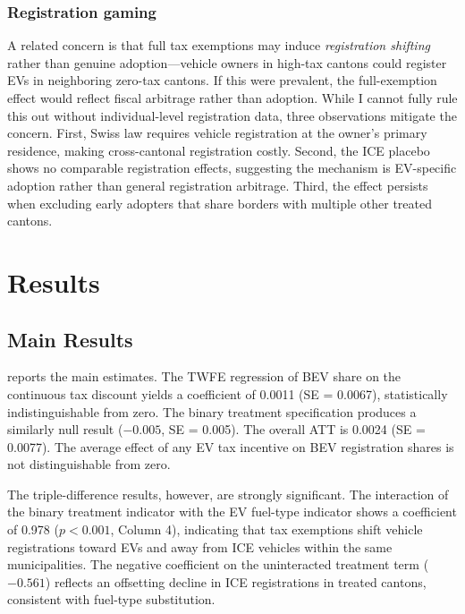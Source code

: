 \documentclass[12pt]{article}
\begin{document}
\subsubsection*{Registration gaming} A related concern is that full tax exemptions may induce \textit{registration shifting} rather than genuine adoption---vehicle owners in high-tax cantons could register EVs in neighboring zero-tax cantons. If this were prevalent, the full-exemption effect would reflect fiscal arbitrage rather than adoption. While I cannot fully rule this out without individual-level registration data, three observations mitigate the concern. First, Swiss law requires vehicle registration at the owner's primary residence, making cross-cantonal registration costly. Second, the ICE placebo shows no comparable registration effects, suggesting the mechanism is EV-specific adoption rather than general registration arbitrage. Third, the effect persists when excluding early adopters that share borders with multiple other treated cantons.

\section{Results}

\subsection{Main Results}

 reports the main estimates. The TWFE regression of BEV share on the continuous tax discount yields a coefficient of 0.0011 (SE = 0.0067), statistically indistinguishable from zero. The binary treatment specification produces a similarly null result ($-0.005$, SE = 0.005). The \citet{callaway2021difference} overall ATT is 0.0024 (SE = 0.0077). The average effect of any EV tax incentive on BEV registration shares is not distinguishable from zero.

The triple-difference results, however, are strongly significant. The interaction of the binary treatment indicator with the EV fuel-type indicator shows a coefficient of 0.978 ($p < 0.001$,  Column 4), indicating that tax exemptions shift vehicle registrations toward EVs and away from ICE vehicles within the same municipalities. The negative coefficient on the uninteracted treatment term ($-0.561$) reflects an offsetting decline in ICE registrations in treated cantons, consistent with fuel-type substitution.


\end{document}

